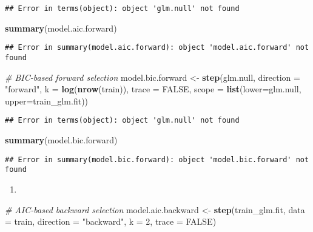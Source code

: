 \documentclass[]{article}
\newenvironment{Shaded}{\begin{snugshade}}{\end{snugshade}}
\newcommand{\CommentTok}[1]{\textcolor[rgb]{0.56,0.35,0.01}{\textit{#1}}}
\newcommand{\DataTypeTok}[1]{\textcolor[rgb]{0.13,0.29,0.53}{#1}}
\newcommand{\DecValTok}[1]{\textcolor[rgb]{0.00,0.00,0.81}{#1}}
\newcommand{\KeywordTok}[1]{\textcolor[rgb]{0.13,0.29,0.53}{\textbf{#1}}}
\newcommand{\NormalTok}[1]{#1}
\newcommand{\OtherTok}[1]{\textcolor[rgb]{0.56,0.35,0.01}{#1}}
\newcommand{\StringTok}[1]{\textcolor[rgb]{0.31,0.60,0.02}{#1}}
\begin{document}
\begin{verbatim}
## Error in terms(object): object 'glm.null' not found
\end{verbatim}

\begin{Shaded}
\begin{Highlighting}[]
\KeywordTok{summary}\NormalTok{(model.aic.forward)}
\end{Highlighting}
\end{Shaded}

\begin{verbatim}
## Error in summary(model.aic.forward): object 'model.aic.forward' not found
\end{verbatim}

\begin{Shaded}
\begin{Highlighting}[]
\CommentTok{# BIC-based forward selection}
\NormalTok{model.bic.forward <-}\StringTok{ }\KeywordTok{step}\NormalTok{(glm.null, }\DataTypeTok{direction =} \StringTok{"forward"}\NormalTok{, }\DataTypeTok{k =} \KeywordTok{log}\NormalTok{(}\KeywordTok{nrow}\NormalTok{(train)), }\DataTypeTok{trace =} \OtherTok{FALSE}\NormalTok{,}
                          \DataTypeTok{scope =} \KeywordTok{list}\NormalTok{(}\DataTypeTok{lower=}\NormalTok{glm.null, }\DataTypeTok{upper=}\NormalTok{train_glm.fit))}
\end{Highlighting}
\end{Shaded}

\begin{verbatim}
## Error in terms(object): object 'glm.null' not found
\end{verbatim}

\begin{Shaded}
\begin{Highlighting}[]
\KeywordTok{summary}\NormalTok{(model.bic.forward)}
\end{Highlighting}
\end{Shaded}

\begin{verbatim}
## Error in summary(model.bic.forward): object 'model.bic.forward' not found
\end{verbatim}

\begin{enumerate}
\def\labelenumi{(\alph{enumi})}
\setcounter{enumi}{1}
\item
\end{enumerate}

\begin{Shaded}
\begin{Highlighting}[]
\CommentTok{# AIC-based backward selection}
\NormalTok{model.aic.backward <-}\StringTok{ }\KeywordTok{step}\NormalTok{(train_glm.fit,  }\DataTypeTok{data =}\NormalTok{ train, }\DataTypeTok{direction =} \StringTok{"backward"}\NormalTok{, }\DataTypeTok{k =} \DecValTok{2}\NormalTok{, }\DataTypeTok{trace =} \OtherTok{FALSE}\NormalTok{)}
\end{Highlighting}
\end{Shaded}
\end{document}
